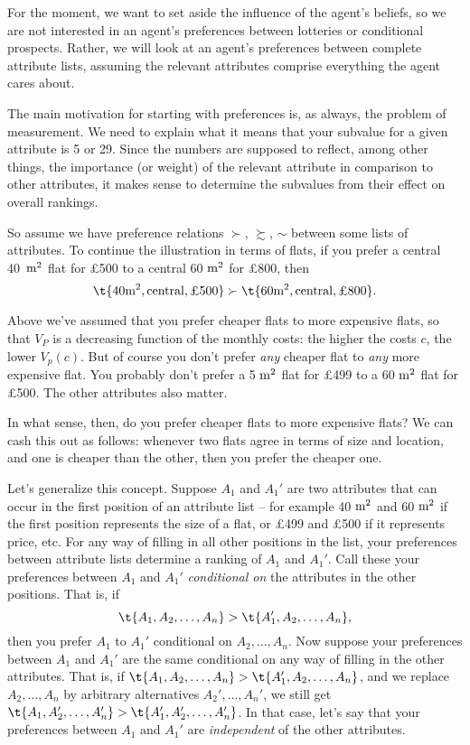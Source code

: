 For the moment, we want to set aside the influence of the agent's
beliefs, so we are not interested in an agent's preferences between
lotteries or conditional prospects. Rather, we will look at an agent's
preferences between complete attribute lists, assuming the relevant
attributes comprise everything the agent cares about. 

The main motivation for starting with preferences is, as always, the
problem of measurement. We need to explain what it means that your
subvalue for a given attribute is 5 or 29. Since the numbers are
supposed to reflect, among other things, the importance (or weight) of
the relevant attribute in comparison to other attributes, it makes
sense to determine the subvalues from their effect on overall
rankings.
 
So assume we have preference relations $\succ$, $\succsim$, $\sim$
between some lists of attributes. To continue the illustration in
terms of flats, if you prefer a central \mbox{40 $\text{m}^2$} flat for £500 to a
central 60 $\text{m}^2$ for £800, then
\[
 \t{40 \m^2, \text{central}, \text{£500}} \succ
 \t{60 \m^2, \text{central}, \text{£800}}.
\]

Above we've assumed that you prefer cheaper flats to more expensive
flats, so that $V_P$ is a decreasing function of the monthly costs:
the higher the costs $c$, the lower $V_p(c)$. But of course you don't
prefer \emph{any} cheaper flat to \emph{any} more expensive flat. You
probably don't prefer a 5 $\text{m}^2$ flat for £499 to a 60 $\text{m}^2$ flat 
for £500. The other attributes also matter.

In what sense, then, do you prefer cheaper flats to more expensive
flats? We can cash this out as follows: whenever two flats agree in
terms of size and location, and one is cheaper than the other, then
you prefer the cheaper one. 

Let's generalize this concept. Suppose $A_1$ and $A_1'$ are two
attributes that can occur in the first position of an attribute list
-- for example 40 $\text{m}^2$ and 60 $\text{m}^2$ if the first position
represents the size of a flat, or £499 and £500 if it represents
price, etc. For any way of filling in all other
positions in the list, your preferences between attribute lists
determine a ranking of $A_1$ and $A_1'$. Call these your preferences
between $A_1$ and $A_1'$ \emph{conditional on} the attributes in the
other positions. That is, if
\[
   \t{A_1,A_2,\ldots,A_n} > \t{A_1',A_2,\ldots,A_n},
\]
then you prefer $A_1$ to $A_1'$ conditional on $A_2,\ldots,A_n$. Now
suppose your preferences between $A_1$ and $A_1'$ are the same
conditional on any way of filling in the other attributes. That is, if
$\t{A_1,A_2,\ldots,A_n} > \t{A_1',A_2,\ldots,A_n}$, and we replace
$A_2,\ldots,A_n$ by arbitrary alternatives $A_2',\ldots,A_n'$, we
still get $\t{A_1,A_2',\ldots,A_n'} > \t{A_1',A_2',\ldots,A_n'}$. In
that case, let's say that your preferences between $A_1$ and $A_1'$ are
\emph{independent} of the other attributes.

